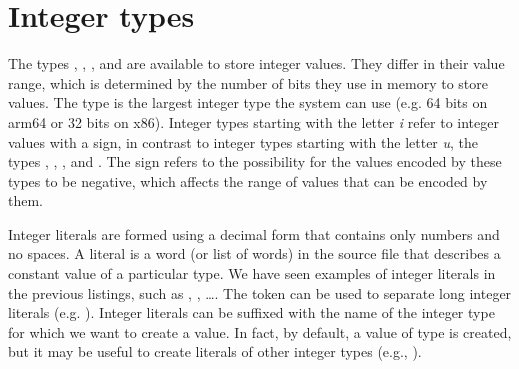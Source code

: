 \section{Integer types}

The types , , ,  and 
are available to store integer values. They differ in their value range, which
is determined by the number of bits they use in memory to store values. The
 type is the largest integer type the system can use (e.g. 64 bits
on arm64 or 32 bits on x86). Integer types starting with the letter \textit{i}
refer to integer values with a sign, in contrast to integer types starting with
the letter \textit{u}, the types , , ,
 and . The sign refers to the possibility for the values
encoded by these types to be negative, which affects the range of values that
can be encoded by them.

Integer literals are formed using a decimal form that contains only numbers and
no spaces. A literal is a word (or list of words) in the source file that
describes a constant value of a particular type. We have seen examples of
integer literals in the previous listings, such as , ,
\ldots. The \token{\_} token can be used to separate long integer literals (e.g.
). Integer literals can be suffixed with the name
of the integer type for which we want to create a value. In fact, by default, a
value of type  is created, but it may be useful to create literals of
other integer types (e.g., ).

